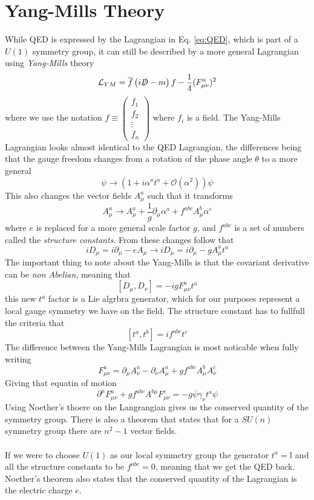 \documentclass[12pt, a4paper]{book}
\begin{document}
\section{Yang-Mills Theory}
While QED is expressed by the Lagrangian in Eq. \ref{eq:QED}, which is part of a $U(1)$ symmetry group, it can still be described by a more general Lagrangian using \textit{Yang-Mills} theory
\begin{equation}\label{eq:YM_lag}
    \mathcal{L}_{YM} = \overline{f}\left(i\slashed{D} -m\right)f -\frac{1}{4}(F^a_{\mu\nu})^2
\end{equation}
where we use the notation $f\equiv\begin{pmatrix}
    f_1\\f_2\\\vdots\\f_n
\end{pmatrix}$ where $f_i$ is a field. The Yang-Mills Lagrangian looks almost identical to the QED Lagrangian, the differences being that the gauge freedom changes from a rotation of the phase angle $\theta$ to a more general
$$
\psi \rightarrow \left(1+i \alpha^a t^a + \mathcal{O}(\alpha^2)\right) \psi
$$ 
This also changes the vector fields $A_\mu^a$ such that it transforms 
$$
A_\mu^a \rightarrow A^a_\mu +\frac{1}{g}\partial_\mu\alpha^a +f^{abc}A_\mu^b\alpha^c
$$
where $e$ is replaced for a more general scale factor $g$, and $f^{abc}$ is a set of numbers called the \textit{structure constants}. From these changes follow that
$$
iD_\mu = i\partial_\mu -eA_\mu\rightarrow iD_\mu = i\partial_\mu -gA^a_\mu t^a
$$
The important thing to note about the Yang-Mills is that the covariant derivative can be \textit{non Abelian}, meaning that 
$$
\left[D_\mu,D_\nu\right] = -igF_{\mu\nu}^at^a
$$
this new $t^a$ factor is a Lie algrbra generator, which for our purposes represent a local gauge symmetry we have on the field. The structure constant has to fullfull the criteria that
\begin{equation}\label{eq:struc_const}
    [t^a,t^b]=if^{abc}t^c
\end{equation}The difference between the Yang-Mills Lagrangian is most noticable when fully writing
$$
F_{\mu\nu}^a = \partial_\mu A_\nu^a -\partial_\nu A_\mu^a +gf^{abc}A_\mu^b A_\nu^c
$$
Giving that equatin of motion
\begin{equation}\label{eq:YM_eq}
    \partial^\mu F^a_{\mu\nu} +gf^{abc}A^{b\mu}F^c_{\mu\nu} = -g\overline{\psi}\gamma_\nu t^a\psi
\end{equation}
Using Noether's thoere on the Langrangian gives us the conserved quantity of the symmetry group. There is also a theorem that states that for a $SU(n)$ symmetry group there are $n^2-1$ vector fields.\\
\\If we were to choose $U(1)$ as our local symmetry group the generator $t^a = \mathbb{I}$ and all the structure constants to be $f^{abc}=0$, meaning that we get the QED back. 
Noether's theorem also states that the conserved quantity of the Lagrangian is the electric charge $e$.
\end{document}
